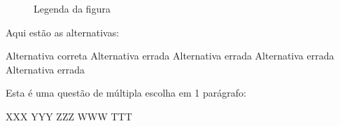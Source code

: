\begin{figure}[H]
\centering
\caption{Legenda da figura}
\label{fig:orto1}
\end{figure}

Aqui estão as alternativas:

\begin{choices}
\CorrectChoice Alternativa correta
\choice Alternativa errada
\choice Alternativa errada
\choice Alternativa errada
\choice Alternativa errada
\end{choices}

\question
Esta é uma questão de múltipla escolha em 1 parágrafo:

\hspace{0.92cm}\begin{oneparchoices}
\CorrectChoice XXX
\choice YYY
\choice ZZZ
\choice WWW
\choice TTT
\end{oneparchoices}

